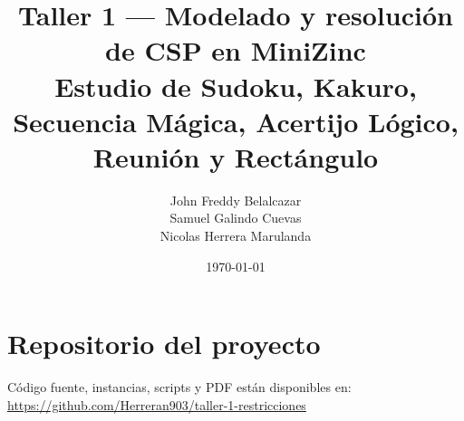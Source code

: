 \documentclass[11pt,a4paper]{article}
\title{Taller 1 — Modelado y resolución de CSP en MiniZinc\\
\large Estudio de Sudoku, Kakuro, Secuencia Mágica, Acertijo Lógico, Reunión y Rectángulo}
\author{John Freddy Belalcazar \\ Samuel Galindo Cuevas \\ Nicolas Herrera Marulanda}
\date{\today}
\begin{document}
\maketitle
\tableofcontents

\section*{Repositorio del proyecto}
Código fuente, instancias, scripts y PDF están disponibles en: {\url{https://github.com/Herreran903/taller-1-restricciones}}










































\end{document}

